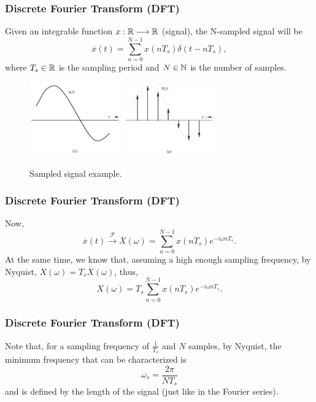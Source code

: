 \documentclass{beamer}
\begin{document}
\begin{frame}
    \frametitle{Discrete Fourier Transform (DFT)}
    Given an integrable function $x: \mathbb{R} \longrightarrow \mathbb{R}$ (signal), the N-sampled signal will be \[
	    \overline{x}(t) = \sum_{n=0}^{N-1} x\left( n T_s \right) \delta \left( t - n T_s \right) 
	,\] where $T_s \in \mathbb{R}$ is the sampling period and $N\in \mathbb{N}$ is the number of samples.

    \begin{figure}
	\centering
	\includegraphics[width=0.35\textwidth]{fft_sampling_signal_a.png}
	\includegraphics[width=0.35\textwidth]{fft_sampling_signal_b.png}
	\caption{Sampled signal example.}
	\label{fig:fft_sampling_signal_b-png}
    \end{figure}
\end{frame}

\begin{frame}
    \frametitle{Discrete Fourier Transform (DFT)}
    Now,\[
	\overline{x}(t) \xrightarrow{\mathcal{F}} \overline{X}\left( \omega \right) =\sum_{n=0}^{N-1} x\left( n T_s \right) e^{-i\omega n T_s}
    .\]
    At the same time, we know that, assuming a high enough sampling frequency, by Nyquist, $X\left( \omega \right) = T_s \overline{X}\left( \omega \right)$, thus, \[
    X\left( \omega \right) = T_s \sum_{n=0}^{N-1} x\left( n T_s \right) e^{-i\omega n T_s}
    .\] 
\end{frame}

\begin{frame}
    \frametitle{Discrete Fourier Transform (DFT)}
    Note that, for a sampling frequency of $\frac{1}{T_s}$ and $N$ samples, by Nyquist, the minimum frequency that can be characterized is \[
    \omega_s = \frac{2\pi}{N T_s}
    \] and is defined by the length of the signal (just like in the Fourier series).
\end{frame}
\end{document}
